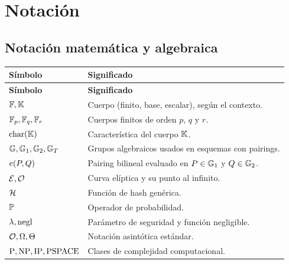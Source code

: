 \chapter*{Notación}

\begingroup
\small
\setlength{\LTleft}{0pt}
\setlength{\LTright}{0pt}
\renewcommand{\arraystretch}{1.15}

\section*{Notación matemática y algebraica}
\begin{longtable}{p{}p{}}
\toprule
\textbf{Símbolo} & \textbf{Significado} \\
\midrule
\endfirsthead
\toprule
\textbf{Símbolo} & \textbf{Significado} \\
\midrule
\endhead
$\mathbb{F}, \mathbb{K}$ & Cuerpo (finito, base, escalar), según el contexto. \\
$\mathbb{F}_p, \mathbb{F}_q, \mathbb{F}_r$ & Cuerpos finitos de orden $p$, $q$ y $r$. \\
$\mathrm{char}(\mathbb{K})$ & Característica del cuerpo $\mathbb{K}$. \\
$\mathbb{G}, \mathbb{G}_1, \mathbb{G}_2, \mathbb{G}_T$ & Grupos algebraicos usados en esquemas con pairings. \\
$e\!\left(P,Q\right)$ & Pairing bilineal evaluado en $P \in \mathbb{G}_1$ y $Q \in \mathbb{G}_2$. \\
$\mathcal{E}, \mathcal{O}$ & Curva elíptica y su punto al infinito. \\
$\mathcal{H}$ & Función de hash genérica. \\
$\mathbb{P}$ & Operador de probabilidad. \\
$\lambda, \mathrm{negl}$ & Parámetro de seguridad y función negligible. \\
$\mathcal{O}, \Omega, \Theta$ & Notación asintótica estándar. \\
$\mathrm{P}, \mathrm{NP}, \mathrm{IP}, \mathrm{PSPACE}$ & Clases de complejidad computacional. \\
\bottomrule
\end{longtable}

